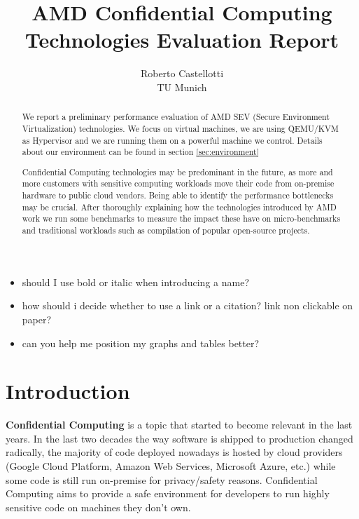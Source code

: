 \documentclass[twocolumn]{article}
\begin{document}
\date{}
\title{\Large \bf AMD Confidential Computing Technologies Evaluation Report}
\author{{\rm Roberto Castellotti}\\TU Munich}
\maketitle


\begin{itemize}
    \item should I use bold or italic when introducing a name?
    \item how should i decide whether to use a link or a citation? link non clickable on paper?
    \item can you help me position my graphs and tables better?
\end{itemize}
\begin{abstract}
We report a preliminary performance evaluation of AMD SEV (Secure Environment Virtualization) technologies.
We focus on virtual machines, we are using QEMU/KVM as Hypervisor and we are running them on a powerful machine we control.
Details about our environment can be found in section \ref{sec:environment}

Confidential Computing technologies may be predominant in the future, as more and more customers with sensitive computing workloads move their code from on-premise hardware to public cloud vendors. Being able to identify the performance bottlenecks may be crucial. After thoroughly explaining how the technologies introduced by AMD work we run some benchmarks to measure the impact these have on micro-benchmarks and traditional workloads such as compilation of popular open-source projects.
\end{abstract}

\section{Introduction}

\textbf{Confidential Computing} is a topic that started to become relevant in the last years. In the last two decades the way software is shipped to production changed radically, the majority of code deployed nowadays is hosted by cloud providers (Google Cloud Platform, Amazon Web Services, Microsoft Azure, etc.) while some code is still run on-premise for privacy/safety reasons. Confidential Computing aims to provide a safe environment for developers to run highly sensitive code on machines they don't own. 
\end{document}
